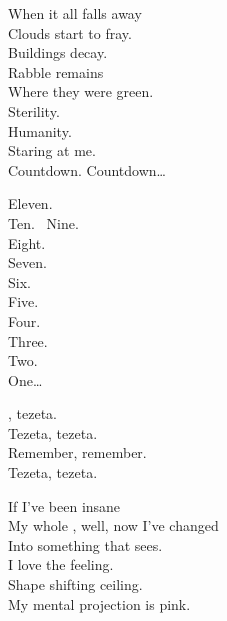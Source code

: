 When it all falls away \\
Clouds start to fray. \\
Buildings decay. \\
Rabble remains \\
Where they were green. \\
Sterility. \\
Humanity. \\
Staring at me. \\

Countdown. Countdown… \\





Eleven. \\
Ten. \
Nine. \\
Eight. \\
Seven. \\
Six. \\
Five. \\
Four. \\
Three. \\
Two. \\
One… \\





, tezeta. \\
Tezeta, tezeta. \\
Remember, remember. \\
Tezeta, tezeta. \\


If I've been insane \\
My whole , well, now I've changed \\
Into something that sees. \\
I love the feeling. \\
Shape shifting ceiling. \\
My mental projection is pink. \\


